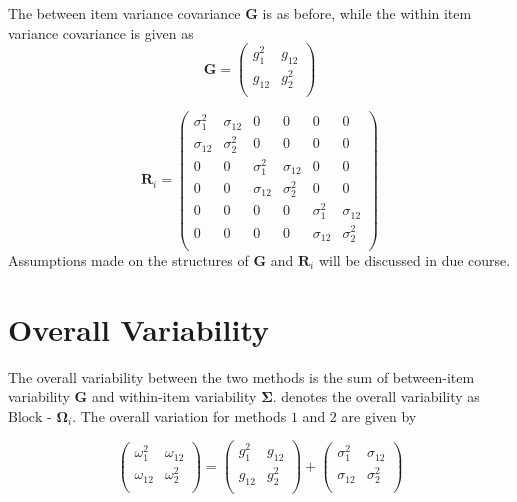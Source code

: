 \documentclass[12pt, a4paper]{report}
\theoremstyle{plain}
\theoremstyle{definition}
\theoremstyle{remark}
\begin{document}
The between item variance covariance $\boldsymbol{G}$ is as before, while the within item variance covariance is given as
\[ \boldsymbol{G} =\left(
\begin{array}{cc}
g^2_1  & g_{12} \\
g_{12} & g^2_2 \\
\end{array}
\right) \]

\[
\boldsymbol{R}_i = \left(
\begin{array}{cccccc}
\sigma^2_{1} & \sigma_{12} & 0 & 0 & 0 & 0 \\
\sigma_{12} & \sigma^2_{2} & 0 & 0 & 0 & 0 \\
0 & 0 & \sigma^2_{1} & \sigma_{12} & 0 & 0 \\
0 & 0 & \sigma_{12} & \sigma^2_{2} & 0 & 0 \\
0 & 0 & 0 & 0 & \sigma^2_{1} & \sigma_{12} \\
0 & 0 & 0 & 0 & \sigma_{12} & \sigma^2_{2} \\
\end{array} \right)
\]
Assumptions made on the structures of $\boldsymbol{G}$ and $\boldsymbol{R}_i$ will be discussed in due course.


\section{Overall Variability}
The overall variability between the two methods is the sum of between-item variability
$\boldsymbol{G}$ and within-item variability $\boldsymbol{\Sigma}$. \citet{ARoy2009} denotes the overall variability	as ${\mbox{Block - }\boldsymbol \Omega_{i}}$. The overall variation for methods $1$ and $2$ are given by

\begin{center}
	\[\left(\begin{array}{cc}
	\omega^2_1  & \omega_{12} \\
	\omega_{12} & \omega^2_2 \\
	\end{array}  \right)
	=  \left(
	\begin{array}{cc}
	g^2_1  & g_{12} \\
	g_{12} & g^2_2 \\
	\end{array} \right)+
	\left(
	\begin{array}{cc}
	\sigma^2_1  & \sigma_{12} \\
	\sigma_{12} & \sigma^2_2 \\
	\end{array}\right)
	\]
\end{center}
\end{document}
